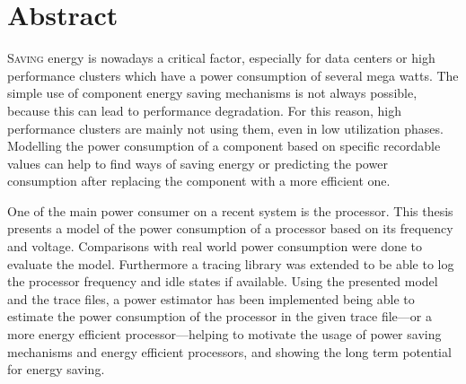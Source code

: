 \chapter*{Abstract}
\thispagestyle{empty}
\lettrine[lines=2, lhang=.2, lraise=.1]{S}{aving} energy is nowadays a critical factor, especially for data centers or high performance clusters which have a power consumption of several mega watts. The simple use of component energy saving mechanisms is not always possible, because this can lead to performance degradation. For this reason, high performance clusters are mainly not using them, even in low utilization phases. Modelling the power consumption of a component based on specific recordable values can help to find ways of saving energy or predicting the power consumption after replacing the component with a more efficient one.

One of the main power consumer on a recent system is the processor. This thesis presents a model of the power consumption of a processor based on its frequency and voltage. Comparisons with real world power consumption were done to evaluate the model. Furthermore a tracing library was extended to be able to log the processor frequency and idle states if available. Using the presented model and the trace files, a power estimator has been implemented being able to estimate the power consumption of the processor in the given trace file---or a more energy efficient processor---helping to motivate the usage of power saving mechanisms and energy efficient processors, and showing the long term potential for energy saving.